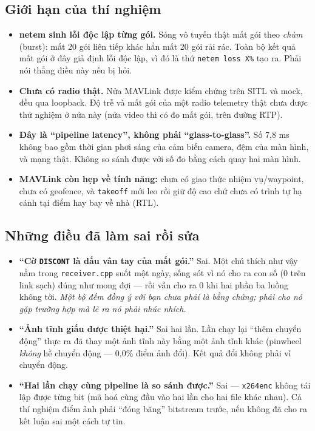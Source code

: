 \documentclass[12pt]{ai_conquer2026}
\begin{document}
\subsection{Giới hạn của thí nghiệm}

\begin{itemize}
\item \textbf{netem sinh lỗi độc lập từng gói.} Sóng vô tuyến thật mất gói theo
      \emph{chùm} (burst): mất 20 gói liên tiếp khác hẳn mất 20 gói rải rác. Toàn
      bộ kết quả mất gói ở đây giả định lỗi độc lập, vì đó là thứ
      \texttt{netem loss X\%} tạo ra. Phải nói thẳng điều này nếu bị hỏi.
\item \textbf{Chưa có radio thật.} Nửa MAVLink được kiểm chứng trên SITL và mock,
      đều qua loopback. Độ trễ và mất gói của một radio telemetry thật chưa được
      thử nghiệm ở nửa này (nửa video thì có đo mất gói, trên đường RTP).
\item \textbf{Đây là ``pipeline latency'', không phải ``glass-to-glass''.} Số
      7,8 ms không bao gồm thời gian phơi sáng của cảm biến camera, đệm của màn
      hình, và mạng thật. Không so sánh được với số đo bằng cách quay hai màn
      hình.
\item \textbf{MAVLink còn hẹp về tính năng:} chưa có giao thức nhiệm vụ/waypoint,
      chưa có geofence, và \texttt{takeoff} mới leo rồi giữ độ cao chứ chưa có
      trình tự hạ cánh tại điểm hay bay về nhà (RTL).
\end{itemize}

\subsection{Những điều đã làm sai rồi sửa}

\begin{itemize}
\item \textbf{``Cờ \texttt{DISCONT} là dấu vân tay của mất gói.''} Sai. Một chú
      thích như vậy nằm trong \texttt{receiver.cpp} suốt một ngày, sống sót vì nó
      cho ra con số (0 trên link sạch) đúng như mong đợi --- rồi vẫn cho ra 0 khi
      hai phần ba luồng không tới. \emph{Một bộ đếm đồng ý với bạn chưa phải là
      bằng chứng; phải cho nó gặp trường hợp mà lẽ ra nó phải nhúc nhích.}
\item \textbf{``Ảnh tĩnh giấu được thiệt hại.''} Sai hai lần. Lần chạy lại
      ``thêm chuyển động'' thực ra đã thay một ảnh tĩnh này bằng một ảnh tĩnh
      khác (pinwheel \emph{không} hề chuyển động --- 0,0\% điểm ảnh đổi). Kết quả
      đổi không phải vì chuyển động.
\item \textbf{``Hai lần chạy cùng pipeline là so sánh được.''} Sai ---
      \texttt{x264enc} không tái lập được từng bit (mã hoá cùng đầu vào hai lần
      cho hai file khác nhau). Cả thí nghiệm điểm ảnh phải ``đóng băng'' bitstream
      trước, nếu không đã cho ra kết luận sai một cách tự tin.
\end{itemize}
\end{document}
